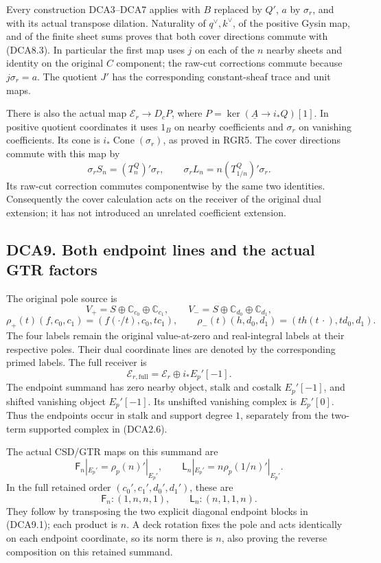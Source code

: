 Every construction DCA3--DCA7 applies with \(B\) replaced by \(Q'\),
\(a\) by \(\sigma_r\), and with its actual transpose dilation.
Naturality of \(q^\vee,k^\vee\), of the positive Gysin map, and of the
finite sheet sums proves that both cover directions commute with
(DCA8.3). In particular the first map uses \(j\) on each of the \(n\)
nearby sheets and identity on the original \(C\) component; the raw-cut
corrections commute because \(j\sigma_r=a\). The quotient \(J'\) has the
corresponding constant-sheaf trace and unit maps.

There is also the actual map \(\mathscr E_r\to D_cP\), where
\(P=\ker(\underline A\to i_*Q)[1]\). In positive quotient coordinates it
uses \(1_B\) on nearby coefficients and \(\sigma_r\) on vanishing
coefficients. Its cone is \(i_*\operatorname{Cone}(\sigma_r)\), as
proved in RGR5. The cover directions commute with this map by \[
\sigma_rS_n=(T_n^Q)'\sigma_r,\qquad
\sigma_rL_n=n(T_{1/n}^Q)'\sigma_r.
\tag{DCA8.4}
\] Its raw-cut correction commutes componentwise by the same two
identities. Consequently the cover calculation acts on the receiver of
the original dual extension; it has not introduced an unrelated
coefficient extension.

\subsection{DCA9. Both endpoint lines and the actual GTR
factors}\label{dca9.-both-endpoint-lines-and-the-actual-gtr-factors}

The original pole source is \[
V_+=S\oplus\mathbb C_{c_0}\oplus\mathbb C_{c_1},\qquad
V_-=S\oplus\mathbb C_{d_0}\oplus\mathbb C_{d_1},
\] \[
\rho_+(t)(f,c_0,c_1)=(f(\cdot/t),c_0,tc_1),\qquad
\rho_-(t)(h,d_0,d_1)=(t h(t\,\cdot),td_0,d_1).
\tag{DCA9.1}
\] The four labels remain the original value-at-zero and real-integral
labels at their respective poles. Their dual coordinate lines are
denoted by the corresponding primed labels. The full receiver is \[
\mathscr E_{r,\mathrm{full}}=\mathscr E_r\oplus i_*E_p'[-1].
\tag{DCA9.2}
\] The endpoint summand has zero nearby object, stalk and costalk
\(E_p'[-1]\), and shifted vanishing object \(E_p'[-1]\). Its unshifted
vanishing complex is \(E_p'[0]\). Thus the endpoints occur in stalk and
support degree \(1\), separately from the two-term supported complex in
(DCA2.6).

The actual CSD/GTR maps on this summand are \[
\mathsf F_n|_{E_p'}=\rho_p(n)'|_{E_p'},\qquad
\mathsf L_n|_{E_p'}=n\rho_p(1/n)'|_{E_p'}.
\tag{DCA9.3}
\] In the full retained order \((c_0',c_1',d_0',d_1')\), these are \[
\boxed{\mathsf F_n:(1,n,n,1),\qquad
\mathsf L_n:(n,1,1,n).}
\tag{DCA9.4}
\] They follow by transposing the two explicit diagonal endpoint blocks
in (DCA9.1); each product is \(n\). A deck rotation fixes the pole and
acts identically on each endpoint coordinate, so its norm there is
\(n\), also proving the reverse composition on this retained summand.

